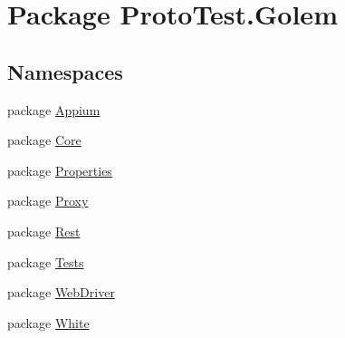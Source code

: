 \hypertarget{namespace_proto_test_1_1_golem}{\section{Package Proto\-Test.\-Golem}
\label{namespace_proto_test_1_1_golem}
}
\subsection*{Namespaces}
\begin{DoxyCompactItemize}
\item 
package \hyperlink{namespace_proto_test_1_1_golem_1_1_appium}{Appium}
\item 
package \hyperlink{namespace_proto_test_1_1_golem_1_1_core}{Core}
\item 
package \hyperlink{namespace_proto_test_1_1_golem_1_1_properties}{Properties}
\item 
package \hyperlink{namespace_proto_test_1_1_golem_1_1_proxy}{Proxy}
\item 
package \hyperlink{namespace_proto_test_1_1_golem_1_1_rest}{Rest}
\item 
package \hyperlink{namespace_proto_test_1_1_golem_1_1_tests}{Tests}
\item 
package \hyperlink{namespace_proto_test_1_1_golem_1_1_web_driver}{Web\-Driver}
\item 
package \hyperlink{namespace_proto_test_1_1_golem_1_1_white}{White}
\end{DoxyCompactItemize}
